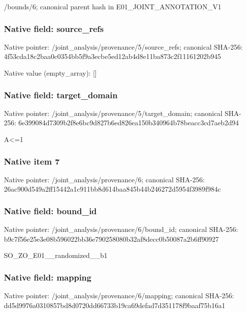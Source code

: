 \documentclass[10pt,a4paper]{article}
\begin{document}
\begingroup\raggedright\sloppy /\allowbreak{}bounds/\allowbreak{}6;\allowbreak{} canonical parent hash in E01\_\allowbreak{}JOINT\_\allowbreak{}ANNOTATION\_\allowbreak{}V1\par\endgroup

\subsubsection{Native field: source\_\allowbreak{}refs}
Native pointer: /joint\_\allowbreak{}analysis/provenance/5/source\_\allowbreak{}refs; canonical SHA-256: 4f53cda18c2baa0c0354bb5f9a3ecbe5ed12ab4d8e11ba873c2f11161202b945

Native value (empty\_\allowbreak{}array): []

\subsubsection{Native field: target\_\allowbreak{}domain}
Native pointer: /joint\_\allowbreak{}analysis/provenance/5/target\_\allowbreak{}domain; canonical SHA-256: 6e399084d7309b2f8e6bc9d827b6ed826ea150b340964b78beacc3cd7aeb2d94

\begingroup\raggedright\sloppy A<=\allowbreak{}1\par\endgroup

\subsubsection{Native item 7}
Native pointer: /joint\_\allowbreak{}analysis/provenance/6; canonical SHA-256: 26ac900d549a2ff15442a1c911bb8d614baa845b44b246272d5954f3989f984c

\subsubsection{Native field: bound\_\allowbreak{}id}
Native pointer: /joint\_\allowbreak{}analysis/provenance/6/bound\_\allowbreak{}id; canonical SHA-256: b9c7f56e25e3e08b596022bb36e790258080b32af8decc0b50087a2b6ff90927

\begingroup\raggedright\sloppy SO\_\allowbreak{}ZO\_\allowbreak{}E01\_\allowbreak{}\_\allowbreak{}randomized\_\allowbreak{}\_\allowbreak{}b1\par\endgroup

\subsubsection{Native field: mapping}
Native pointer: /joint\_\allowbreak{}analysis/provenance/6/mapping; canonical SHA-256: dd5d9976a0310857bd8d0720dd66733b19ca69defad7d351178f9baaf75b16a1
\end{document}

